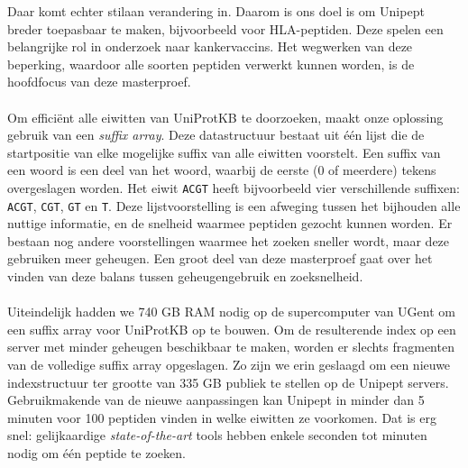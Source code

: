 Daar komt echter stilaan verandering in.
Daarom is ons doel is om Unipept breder toepasbaar te maken, bijvoorbeeld voor HLA-peptiden.
Deze spelen een belangrijke rol in onderzoek naar kankervaccins.
Het wegwerken van deze beperking, waardoor alle soorten peptiden verwerkt kunnen worden, is de hoofdfocus van deze masterproef.
\\ \\
Om efficiënt alle eiwitten van UniProtKB te doorzoeken, maakt onze oplossing gebruik van een \textit{suffix array}.
Deze datastructuur bestaat uit één lijst die de startpositie van elke mogelijke suffix van alle eiwitten voorstelt.
Een suffix van een woord is een deel van het woord, waarbij de eerste (0 of meerdere) tekens overgeslagen worden.
Het eiwit \texttt{ACGT} heeft bijvoorbeeld vier verschillende suffixen:
\texttt{ACGT}, \texttt{CGT}, \texttt{GT} en \texttt{T}.
Deze lijstvoorstelling is een afweging tussen het bijhouden alle nuttige informatie, en de snelheid waarmee peptiden gezocht kunnen worden.
Er bestaan nog andere voorstellingen waarmee het zoeken sneller wordt, maar deze gebruiken meer geheugen.
Een groot deel van deze masterproef gaat over het vinden van deze balans tussen geheugengebruik en zoeksnelheid.
\\ \\
Uiteindelijk hadden we 740 GB RAM nodig op de supercomputer van UGent om een suffix array voor UniProtKB op te bouwen.
Om de resulterende index op een server met minder geheugen beschikbaar te maken, worden er slechts fragmenten van de volledige suffix array opgeslagen.
Zo zijn we erin geslaagd om een nieuwe indexstructuur ter grootte van 335 GB publiek te stellen op de Unipept servers.
Gebruikmakende van de nieuwe aanpassingen kan Unipept in minder dan 5 minuten voor 100 peptiden vinden in welke eiwitten ze voorkomen.
Dat is erg snel: gelijkaardige \textit{state-of-the-art} tools hebben enkele seconden tot minuten nodig om één peptide te zoeken.
\afterpage{\blankpage}
